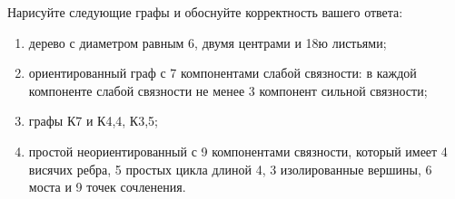 \question 
Нарисуйте следующие графы и обоснуйте корректность вашего ответа:
\begin{enumerate}
\item  дерево с диаметром равным 6, двумя центрами  и  18ю листьями;
\item  ориентированный граф с 7 компонентами слабой связности: в  каждой компоненте слабой связности не менее 3 компонент сильной связности;
\item  графы К7 и К4,4, К3,5;
\item  простой неориентированный с 9 компонентами связности, который имеет 4 висячих ребра, 5 простых цикла длиной 4, 3 изолированные вершины, 6 моста и 9 точек сочленения.
\end{enumerate}
